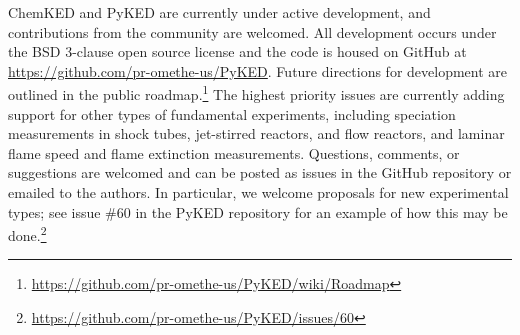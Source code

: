 \documentclass[12pt]{ijck}
\newcommand\ck{ChemKED}
\newcommand\pk{PyKED}
\begin{document}
\ck{} and \pk{} are currently under active development, and contributions from the community are
welcomed. All development occurs under the BSD 3-clause open source license and the code is housed
on GitHub at \url{https://github.com/pr-omethe-us/PyKED}. Future directions for development are
outlined in the public roadmap.\footnote{\url{https://github.com/pr-omethe-us/PyKED/wiki/Roadmap}}
The highest priority issues are currently adding support for other types of fundamental experiments,
including speciation measurements in shock tubes, jet-stirred reactors, and flow reactors, and
laminar flame speed and flame extinction measurements. Questions, comments, or suggestions are
welcomed and can be posted as issues in the GitHub repository or emailed to the authors. In
particular, we welcome proposals for new experimental types; see issue \#60 in the \pk{} repository
for an example of how this may be
done.\footnote{\url{https://github.com/pr-omethe-us/PyKED/issues/60}}

\printbibliography
\end{document}
